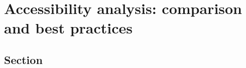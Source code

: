 \chapter{Accessibility analysis: comparison and best practices} 
\label{chap:implementation}


\section{Section}
\label{sec:fourth-section}

\newpage